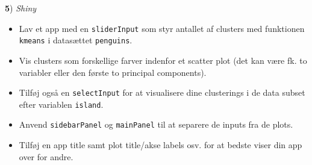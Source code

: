 \documentclass[
]{book}
\providecommand{\tightlist}{%
  \setlength{\itemsep}{0pt}\setlength{\parskip}{0pt}}
\begin{document}
\textbf{5}) \emph{Shiny}

\begin{itemize}
\tightlist
\item
  Lav et app med en \texttt{sliderInput} som styr antallet af clusters med funktionen \texttt{kmeans} i datasættet \texttt{penguins}.
\item
  Vis clusters som forskellige farver indenfor et scatter plot (det kan være fk. to variabler eller den første to principal components).
\item
  Tilføj også en \texttt{selectInput} for at visualisere dine clusterings i de data subset efter variablen \texttt{island}.
\item
  Anvend \texttt{sidebarPanel} og \texttt{mainPanel} til at separere de inputs fra de plots.
\item
  Tilføj en app title samt plot title/akse labels osv. for at bedste viser din app over for andre.
\end{itemize}

  
\end{document}
